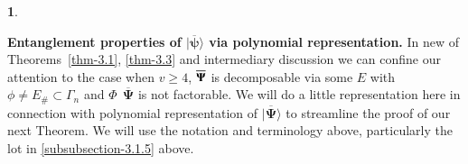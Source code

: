 \documentclass[a4paper,12pt]{article}
\theoremstyle{definition}
\theoremstyle{underlinethm}
\theoremstyle{definition}
\newtheorem{subsubsec}{}[subsection]
\begin{document}
\begin{subsubsec}\label{subsubsection-3.1.6}

\textbf{Entanglement properties of $\mathbf{| \overline{\boldsymbol{\psi}} \rangle}$ via polynomial representation.} In new of Theorems~\ref{thm-3.1}, \ref{thm-3.3} and intermediary discussion we can confine our attention to the case when $v \geq 4$, $\overline{\bold{\Psi}}$ is decomposable via some  $E$ with $\phi \neq E_{\#} \subset \Gamma_{n}$ and $\Phi~~ \overline{\boldsymbol{\Psi}}$ is not factorable. We will do a little representation here in connection with polynomial representation of $| \overline{\boldsymbol{\Psi}} \rangle$ to streamline the proof of our next Theorem. We will use the notation and terminology above, particularly the lot in \eqref{subsubsection-3.1.5} above.
\end{subsubsec}
\end{document}
